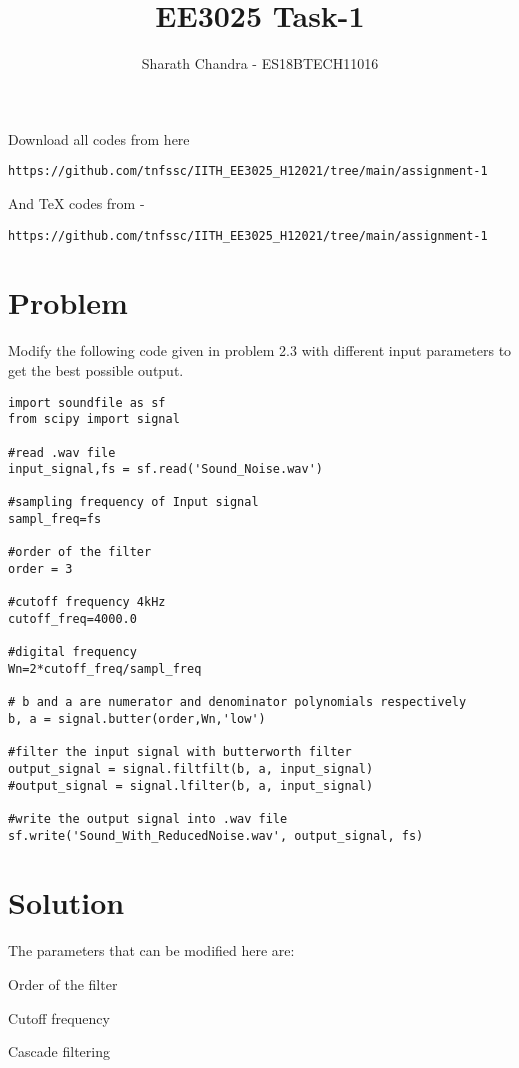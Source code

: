 \documentclass[journal,12pt]{IEEEtran}
\begin{document}
\def\midbox#1{\raisebox{-0.5\baselineskip}[0in][0in]{#1}}
\vspace{3cm}
\title{EE3025 Task-1}
\author{Sharath Chandra - ES18BTECH11016}
\maketitle
\newpage
\bigskip
\renewcommand{\thefigure}{\theenumi}
\renewcommand{\thetable}{\theenumi}
Download all codes from here
\begin{lstlisting}
https://github.com/tnfssc/IITH_EE3025_H12021/tree/main/assignment-1
\end{lstlisting}
And TeX codes from -
\begin{lstlisting}
https://github.com/tnfssc/IITH_EE3025_H12021/tree/main/assignment-1
\end{lstlisting}

\section{\textbf{Problem}}

Modify the following code given in problem 2.3 with different input parameters to get the best possible output.
\begin{lstlisting}
import soundfile as sf
from scipy import signal

#read .wav file
input_signal,fs = sf.read('Sound_Noise.wav')

#sampling frequency of Input signal
sampl_freq=fs

#order of the filter
order = 3

#cutoff frequency 4kHz
cutoff_freq=4000.0

#digital frequency
Wn=2*cutoff_freq/sampl_freq

# b and a are numerator and denominator polynomials respectively
b, a = signal.butter(order,Wn,'low')

#filter the input signal with butterworth filter
output_signal = signal.filtfilt(b, a, input_signal)
#output_signal = signal.lfilter(b, a, input_signal)

#write the output signal into .wav file
sf.write('Sound_With_ReducedNoise.wav', output_signal, fs)

\end{lstlisting}

\section{\textbf{Solution}}
The parameters that can be modified here are:
\begin{description}[font=$\bullet$\scshape\bfseries]
  \item[]{Order of the filter}
  \item[]{Cutoff frequency}
  \item[]{Cascade filtering}
\end{description}
\end{document}
